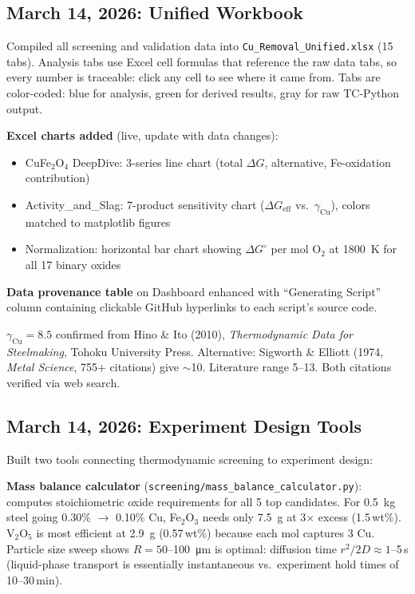 \documentclass[11pt]{article}
\begin{document}
\subsection{March 14, 2026: Unified Workbook}

Compiled all screening and validation data into \texttt{Cu\_Removal\_Unified.xlsx} (15 tabs). Analysis tabs use Excel cell formulas that reference the raw data tabs, so every number is traceable: click any cell to see where it came from. Tabs are color-coded: blue for analysis, green for derived results, gray for raw TC-Python output.

\textbf{Excel charts added} (live, update with data changes):
\begin{itemize}[leftmargin=*]
    \item CuFe$_2$O$_4$ DeepDive: 3-series line chart (total $\Delta G$, alternative, Fe-oxidation contribution)
    \item Activity\_and\_Slag: 7-product sensitivity chart ($\Delta G_{\text{eff}}$ vs.\ $\gamma_{\text{Cu}}$), colors matched to matplotlib figures
    \item Normalization: horizontal bar chart showing $\Delta G^\circ$ per mol O$_2$ at \SI{1800}{\kelvin} for all 17 binary oxides
\end{itemize}

\textbf{Data provenance table} on Dashboard enhanced with ``Generating Script'' column containing clickable GitHub hyperlinks to each script's source code.

\begin{insight}
$\gamma_{\text{Cu}} = 8.5$ confirmed from Hino \& Ito (2010), \textit{Thermodynamic Data for Steelmaking}, Tohoku University Press. Alternative: Sigworth \& Elliott (1974, \textit{Metal Science}, 755+ citations) give $\sim$10. Literature range 5--13. Both citations verified via web search.
\end{insight}


\subsection{March 14, 2026: Experiment Design Tools}

Built two tools connecting thermodynamic screening to experiment design:

\textbf{Mass balance calculator} (\texttt{screening/mass\_balance\_calculator.py}): computes stoichiometric oxide requirements for all 5 top candidates. For \SI{0.5}{\kilogram} steel going 0.30\% $\to$ 0.10\% Cu, Fe$_2$O$_3$ needs only \SI{7.5}{\gram} at 3$\times$ excess (1.5\,wt\%). V$_2$O$_5$ is most efficient at \SI{2.9}{\gram} (0.57\,wt\%) because each mol captures 3 Cu. Particle size sweep shows $R = 50$--\SI{100}{\micro\meter} is optimal: diffusion time $r^2/2D \approx 1$--5\,s (liquid-phase transport is essentially instantaneous vs.\ experiment hold times of 10--30\,min).
\end{document}
